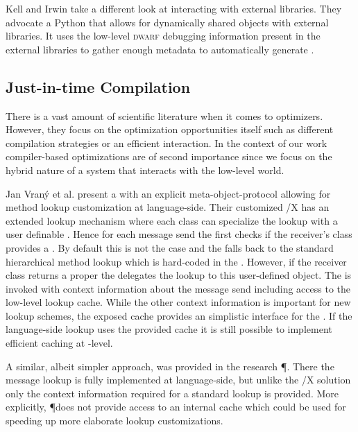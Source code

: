 Kell and Irwin \cite{Kell11a} take a different look at interacting with external libraries.
They advocate a Python \VM that allows for dynamically shared objects with external libraries.
It uses the low-level \textsc{dwarf} debugging information present in the external libraries to gather enough metadata to automatically generate \FFIs.


\subsection{Just-in-time Compilation}
There is a vast amount of scientific literature when it comes to \JIT optimizers.
However, they focus on the optimization opportunities itself such as different compilation strategies or an efficient \GC interaction.
In the context of our work compiler-based optimizations are of second importance since we focus on the hybrid nature of a system that interacts with the low-level \VM world.

Jan Vran\'{y} et al. present a \ST with an explicit meta-object-protocol allowing for method lookup customization at language-side\cite{Vran12a}.
Their customized \ST/X \VM has an extended lookup mechanism where each class can specialize the lookup with a user definable .
Hence for each message send the \VM first checks if the receiver's class provides a .
By default this is not the case and the \VM falls back to the standard hierarchical \ST method lookup which is hard-coded in the \VM.
However, if the receiver class returns a proper  the \VM delegates the lookup to this user-defined object.
The  is invoked with context information about the message send including access to the low-level lookup cache.
While the other context information is important for new lookup schemes, the exposed cache provides an simplistic interface for the \JIT.
If the language-side lookup uses the provided cache it is still possible to implement efficient caching at \VM-level.


A similar, albeit simpler approach, was provided in the research \ST \VM \P \cite{Verw12a}.
There the message lookup is fully implemented at language-side, but unlike the \ST/X solution only the context information required for a standard \ST lookup is provided.
More explicitly, \P does not provide access to an internal cache which could be used for speeding up more elaborate lookup customizations.

